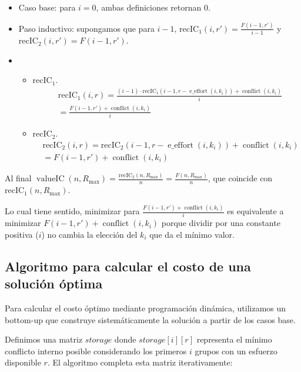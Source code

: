 \begin{itemize}
	\item Caso base: para $i = 0$, ambas definiciones retornan $0$.
	\item Paso inductivo: supongamos que para $i - 1$, $\operatorname{ { recIC }_1 }(i,r') = \frac{ F(i - 1,r') }{ i - 1 }$ y $\operatorname{ { recIC }_2 }(i,r') =F(i - 1,r')$.
	\item \begin{itemize}
			\item $\operatorname{ { recIC }_1 }$.
			\begin{align}
				& \operatorname{ { recIC }_1 }(i,r) = \frac{ (i - 1) \cdot \operatorname{ { recIC }_1 }(i - 1,r - \operatorname{ e\_effort }(i,k_i)) + \operatorname{ conflict }(i,k_i) }{ i } \\
				& = \frac{ F(i - 1,r') + \operatorname{ conflict }(i,k_i) }{ i }
			\end{align}
			\item $\operatorname{ { recIC }_2 }$.
			\begin{align}
				& \operatorname{ { recIC }_2 }(i,r) = \operatorname{ { recIC }_2 }(i - 1,r - \operatorname{ e\_effort }(i,k_i)) + \operatorname{ conflict }(i,k_i) \\
				& = F(i - 1,r') + \operatorname{ conflict }(i,k_i)
			\end{align}
		\end{itemize}
\end{itemize}

Al final $\operatorname{ valueIC }(n,R_{ \max }) = \frac{ \operatorname{ { recIC }_2 }(n,R_{ \max }) }{ n } = \frac{ F(n,R_{ \max }) }{ n }$, que coincide con $\operatorname{ { recIC }_1 }(n,R_{ \max })$.

Lo cual tiene sentido, minimizar para $\frac{ F(i - 1,r') + \operatorname{ conflict }(i,k_i) }{ i }$ es equivalente a minimizar $F(i - 1,r') + \operatorname{ conflict }(i,k_i)$ porque dividir por una constante positiva ($i$) no cambia la elección del $k_i$ que da el mínimo valor.

\subsection{Algoritmo para calcular el costo de una solución óptima}

Para calcular el costo óptimo mediante programación dinámica, utilizamos un bottom-up que construye sistemáticamente la solución a partir de los casos base.

Definimos una matriz $storage$ donde $storage[i][r]$ representa el mínimo conflicto interno posible considerando los primeros $i$ grupos con un esfuerzo disponible $r$. El algoritmo completa esta matriz iterativamente:

